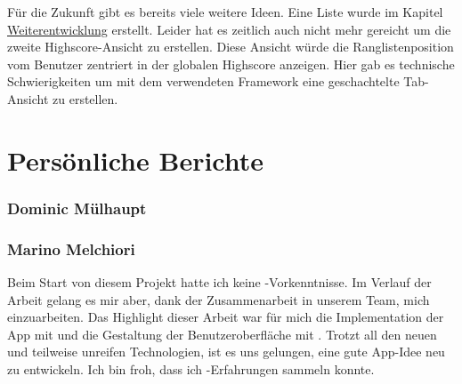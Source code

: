 Für die Zukunft gibt es bereits viele weitere Ideen. 
Eine Liste wurde im Kapitel \hyperref[pd-weiterentwicklung]{Weiterentwicklung} erstellt. 
Leider hat es zeitlich auch nicht mehr gereicht um die zweite Highscore-Ansicht zu erstellen. 
Diese Ansicht würde die Ranglistenposition vom Benutzer zentriert in der globalen Highscore anzeigen. 
Hier gab es technische Schwierigkeiten um mit dem verwendeten \gls{Framework}  eine geschachtelte Tab-Ansicht zu erstellen.

\section{Persönliche Berichte}

\subsubsection{Dominic Mülhaupt}

\subsubsection{Marino Melchiori}
Beim Start von diesem Projekt hatte ich keine -Vorkenntnisse.
Im Verlauf der Arbeit gelang es mir aber, dank der Zusammenarbeit in unserem Team, mich einzuarbeiten.
Das Highlight dieser Arbeit war für mich die Implementation der App mit  und die Gestaltung der Benutzeroberfläche mit .
Trotzt all den neuen und teilweise unreifen Technologien, ist es uns gelungen, eine gute App-Idee neu zu entwickeln.
Ich bin froh, dass ich -Erfahrungen sammeln konnte.